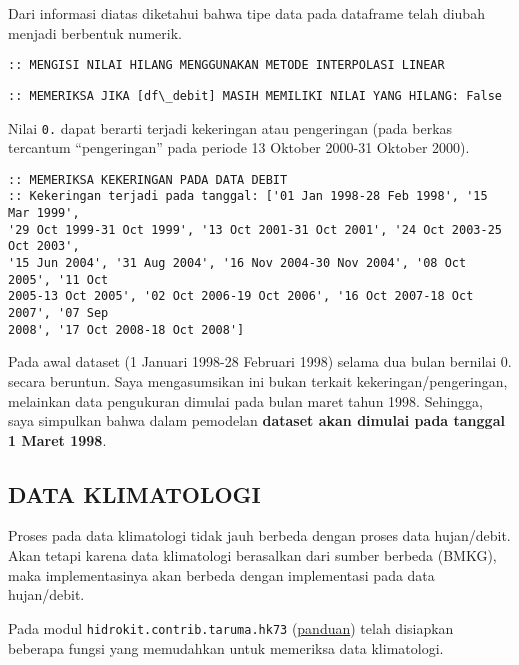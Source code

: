 \documentclass[11pt]{article}
\begin{document}
    Dari informasi diatas diketahui bahwa tipe data pada dataframe telah
diubah menjadi berbentuk numerik.

    \begin{Verbatim}[commandchars=\\\{\}]
:: MENGISI NILAI HILANG MENGGUNAKAN METODE INTERPOLASI LINEAR
    \end{Verbatim}

    \begin{Verbatim}[commandchars=\\\{\}]
:: MEMERIKSA JIKA [df\_debit] MASIH MEMILIKI NILAI YANG HILANG: False
    \end{Verbatim}

    Nilai \texttt{0.} dapat berarti terjadi kekeringan atau pengeringan
(pada berkas tercantum ``pengeringan'' pada periode 13 Oktober 2000-31
Oktober 2000).

    \begin{Verbatim}[commandchars=\\\{\}]
:: MEMERIKSA KEKERINGAN PADA DATA DEBIT
:: Kekeringan terjadi pada tanggal: ['01 Jan 1998-28 Feb 1998', '15 Mar 1999',
'29 Oct 1999-31 Oct 1999', '13 Oct 2001-31 Oct 2001', '24 Oct 2003-25 Oct 2003',
'15 Jun 2004', '31 Aug 2004', '16 Nov 2004-30 Nov 2004', '08 Oct 2005', '11 Oct
2005-13 Oct 2005', '02 Oct 2006-19 Oct 2006', '16 Oct 2007-18 Oct 2007', '07 Sep
2008', '17 Oct 2008-18 Oct 2008']
    \end{Verbatim}

    Pada awal dataset (1 Januari 1998-28 Februari 1998) selama dua bulan
bernilai 0. secara beruntun. Saya mengasumsikan ini bukan terkait
kekeringan/pengeringan, melainkan data pengukuran dimulai pada bulan
maret tahun 1998. Sehingga, saya simpulkan bahwa dalam pemodelan
\textbf{dataset akan dimulai pada tanggal 1 Maret 1998}.

    \hypertarget{data-klimatologi}{%
\subsection{DATA KLIMATOLOGI}\label{data-klimatologi}}

Proses pada data klimatologi tidak jauh berbeda dengan proses data
hujan/debit. Akan tetapi karena data klimatologi berasalkan dari sumber
berbeda (BMKG), maka implementasinya akan berbeda dengan implementasi
pada data hujan/debit.

Pada modul \texttt{hidrokit.contrib.taruma.hk73}
(\href{https://nbviewer.jupyter.org/gist/taruma/b00880905f297013f046dad95dc2e284}{panduan})
telah disiapkan beberapa fungsi yang memudahkan untuk memeriksa data
klimatologi.
\end{document}
